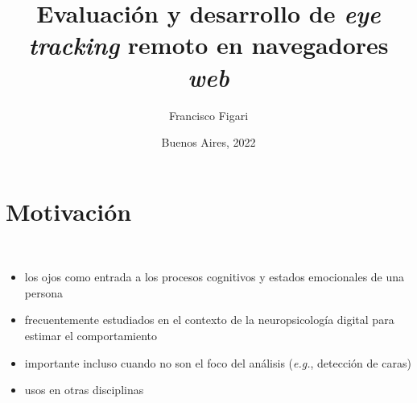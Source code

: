 \documentclass[aspectratio=169]{beamer}
\title{Evaluación y desarrollo de \textit{eye tracking} remoto en navegadores
\textit{web}}
\author{Francisco Figari}
\date{Buenos Aires, 2022}
\begin{document}

\frame{\titlepage}

\section{Motivación}

\begin{frame}{~}

  \begin{itemize}
      \item los ojos como entrada a los procesos cognitivos y estados
        emocionales de una persona
      \item frecuentemente estudiados en el contexto de la neuropsicología
        digital para estimar el comportamiento
      \item importante incluso cuando no son el foco del análisis
        (\textit{e.g.}, detección de caras)
      \item usos en otras disciplinas
  \end{itemize}


\end{frame}
\end{document}
